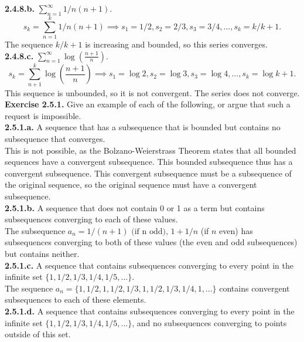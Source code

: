 \documentclass[12pt,letterpaper]{article}
\begin{document}
\textbf{2.4.8.b.} \(\sum_{n=1}^{\infty} 1/n(n+1)\). \\

\[s_{k} = \sum_{n=1}^{k} 1/n(n+1) \implies s_{1} = 1/2, s_{2} = 2/3, s_{3} = 3/4, ..., s_{k} = k/k+1.\] The sequence \(k/k+1\) is increasing and bounded, so this series converges. \\

\textbf{2.4.8.c.} \(\sum_{n=1}^{\infty} \log\left(\frac{n+1}{n}\right)\). \\

\[s_{k} = \sum_{n+1}^{k} \log\left(\frac{n+1}{n}\right) \implies s_{1} = \log 2, s_{2} = \log 3, s_{3} = \log 4, ..., s_{k} = \log k+1.\] This sequence is unbounded, so it is not convergent. The series does not converge. \\

\textbf{Exercise 2.5.1.} Give an example of each of the following, or argue that such a request is impossible. \\

\textbf{2.5.1.a.} A sequence that has a subsequence that is bounded but contains no subsequence that converges. \\

This is not possible, as the Bolzano-Weierstrass Theorem states that all bounded sequences have a convergent subsequence. This bounded subsequence thus has a convergent subsequence. This convergent subsequence must be a subsequence of the original sequence, so the original sequence must have a convergent subsequence. \\

\textbf{2.5.1.b.} A sequence that does not contain 0 or 1 as a term but contains subsequences converging to each of these values. \\

The subsequence \(a_{n} = 1/(n+1) \text{ (if n odd), } 1+1/n \) (if \(n\) even) has subsequences converging to both of these values (the even and odd subsequences) but contains neither. \\

\textbf{2.5.1.c.} A sequence that contains subsequences converging to every point in the infinite set \(\{1,1/2,1/3,1/4,1/5,...\}\). \\

The sequence \(a_{n} = \{1, 1/2, 1, 1/2, 1/3, 1, 1/2, 1/3, 1/4, 1, ...\}\) contains convergent subsequences to each of these elements. \\

\textbf{2.5.1.d.} A sequence that contains subsequences converging to every point in the infinite set \(\{1,1/2,1/3,1/4,1/5,...\}\), and no subsequences converging to points outside of this set. \\
\end{document}
